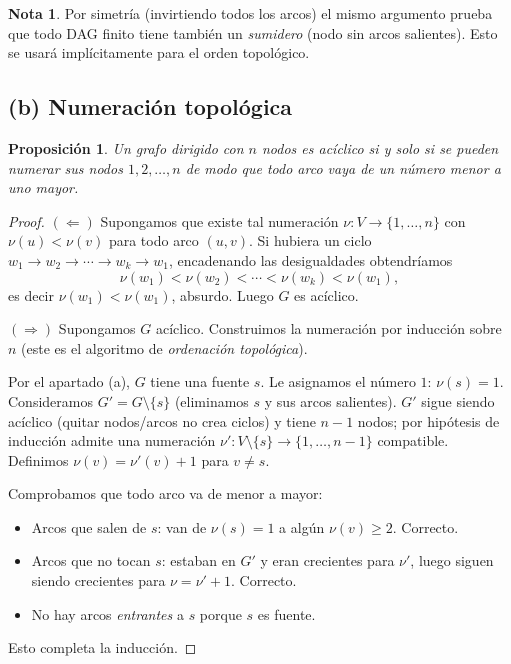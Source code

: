 \documentclass[11pt,a4paper]{article}
\theoremstyle{plain}
\newtheorem{proposicion}{Proposici\'on}
\theoremstyle{definition}
\newtheorem*{nota}{Nota}
\begin{document}
\begin{nota}
Por simetr\'ia (invirtiendo todos los arcos) el mismo argumento prueba que todo DAG
finito tiene tambi\'en un \emph{sumidero} (nodo sin arcos salientes). Esto se usar\'a
impl\'icitamente para el orden topol\'ogico.
\end{nota}

\subsection*{(b) Numeraci\'on topol\'ogica}

\begin{proposicion}
Un grafo dirigido con $n$ nodos es ac\'iclico si y solo si se pueden numerar sus nodos
$1,2,\dots,n$ de modo que todo arco vaya de un n\'umero menor a uno mayor.
\end{proposicion}

\begin{proof}
$(\Leftarrow)$ Supongamos que existe tal numeraci\'on $\nu:V\to\{1,\dots,n\}$ con
$\nu(u)<\nu(v)$ para todo arco $(u,v)$. Si hubiera un ciclo
$w_1\to w_2\to\cdots\to w_k\to w_1$, encadenando las desigualdades obtendr\'iamos
\[
\nu(w_1)<\nu(w_2)<\cdots<\nu(w_k)<\nu(w_1),
\]
es decir $\nu(w_1)<\nu(w_1)$, absurdo. Luego $G$ es ac\'iclico.

$(\Rightarrow)$ Supongamos $G$ ac\'iclico. Construimos la numeraci\'on por inducci\'on
sobre $n$ (este es el algoritmo de \emph{ordenaci\'on topol\'ogica}).

Por el apartado (a), $G$ tiene una fuente $s$. Le asignamos el n\'umero $1$:
$\nu(s)=1$. Consideramos $G'=G\setminus\{s\}$ (eliminamos $s$ y sus arcos
salientes). $G'$ sigue siendo ac\'iclico (quitar nodos/arcos no crea ciclos) y tiene
$n-1$ nodos; por hip\'otesis de inducci\'on admite una numeraci\'on
$\nu':V\setminus\{s\}\to\{1,\dots,n-1\}$ compatible. Definimos
$\nu(v)=\nu'(v)+1$ para $v\neq s$.

Comprobamos que todo arco va de menor a mayor:
\begin{itemize}[nosep]
  \item Arcos que salen de $s$: van de $\nu(s)=1$ a alg\'un $\nu(v)\geq 2$. Correcto.
  \item Arcos que no tocan $s$: estaban en $G'$ y eran crecientes para $\nu'$, luego
        siguen siendo crecientes para $\nu=\nu'+1$. Correcto.
  \item No hay arcos \emph{entrantes} a $s$ porque $s$ es fuente.
\end{itemize}
Esto completa la inducci\'on.
\end{proof}
\end{document}
